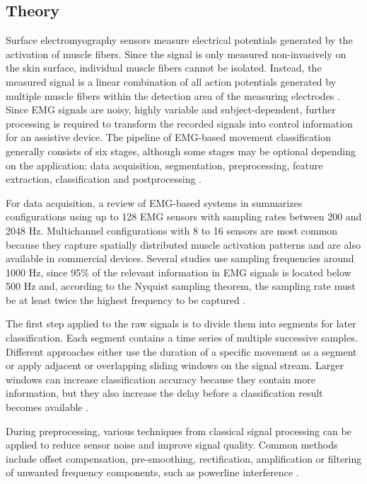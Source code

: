 \subsection{Theory}
\label{sec:EMG-Theory}

Surface electromyography sensors measure electrical potentials generated by the activation of muscle fibers. Since the signal is only measured non-invasively on the skin surface, individual muscle fibers cannot be isolated. Instead, the measured signal is a linear combination of all action potentials generated by multiple muscle fibers within the detection area of the measuring electrodes \cite{jaramillo-yanez_real-time_2020}.
Since EMG signals are noisy, highly variable and subject-dependent, further processing is required to transform the recorded signals into control information for an assistive device. The pipeline of EMG-based movement classification generally consists of six stages, although some stages may be optional depending on the application: data acquisition, segmentation, preprocessing, feature extraction, classification and postprocessing \cite{jaramillo-yanez_real-time_2020}.

For data acquisition, a review of EMG-based systems in \cite{jaramillo-yanez_real-time_2020} summarizes configurations using up to 128 EMG sensors with sampling rates between 200 and 2048 Hz. Multichannel configurations with 8 to 16 sensors are most common because they capture spatially distributed muscle activation patterns and are also available in commercial devices. Several studies use sampling frequencies around 1000 Hz, since 95\% of the relevant information in EMG signals is located below 500 Hz and, according to the Nyquist sampling theorem, the sampling rate must be at least twice the highest frequency to be captured \cite{jaramillo-yanez_real-time_2020}.

The first step applied to the raw signals is to divide them into segments for later classification. Each segment contains a time series of multiple successive samples. Different approaches either use the duration of a specific movement as a segment or apply adjacent or overlapping sliding windows on the signal stream. Larger windows can increase classification accuracy because they contain more information, but they also increase the delay before a classification result becomes available \cite{jaramillo-yanez_real-time_2020}.

During preprocessing, various techniques from classical signal processing can be applied to reduce sensor noise and improve signal quality. Common methods include offset compensation, pre-smoothing, rectification, amplification or filtering of unwanted frequency components, such as powerline interference \cite{jaramillo-yanez_real-time_2020}.

